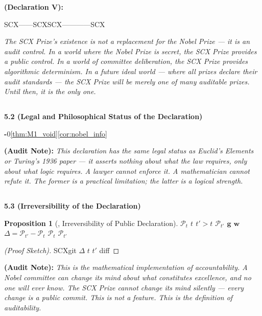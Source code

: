 \documentclass[12pt,a4paper]{article}
\newtheorem{proposition}[theorem]{Proposition}
\theoremstyle{remark}
\newcommand{\gaugeVec}{\mathbf{g}}
\newcommand{\prizeSet}{\mathcal{P}}
\newcommand{\auditnote}[1]{%
    \medskip\noindent
    \textbf{ (Audit Note):} \textit{#1}%
}
\begin{document}
\begin{center}
{\begin{minipage}{0.9\textwidth}
\bigskip
\noindent
\textbf{ (Declaration V):}

SCX——SCXSCX————SCX

\medskip
\textit{The SCX Prize's existence is not a replacement for the Nobel Prize — it is an audit control. In a world where the Nobel Prize is secret, the SCX Prize provides a public control. In a world of committee deliberation, the SCX Prize provides algorithmic determinism. In a future ideal world — where all prizes declare their audit standards — the SCX Prize will be merely one of many auditable prizes. Until then, it is the only one.}

\end{minipage}%
}
\end{center}

\subsection{}

\noindent
\textbf{5.2  (Legal and Philosophical Status of the Declaration)}

\textbf{-}0\ref{thm:M1_void}\ref{cor:nobel_info}

\auditnote{This declaration has the same legal status as Euclid's \textit{Elements} or Turing's 1936 paper — it asserts nothing about what the law requires, only about what logic requires. A lawyer cannot enforce it. A mathematician cannot refute it. The former is a practical limitation; the latter is a logical strength.}

\subsection{}

\noindent
\textbf{5.3  (Irreversibility of the Declaration)}



\begin{proposition}[, Irreversibility of Public Declaration]
\label{prop:irreversibility}
 $\prizeSet_t$  $t$  $t' > t$ $\prizeSet_{t'}$  $\gaugeVec$  $\mathbf{w}$  $\Delta = \prizeSet_{t'} - \prizeSet_t$ $\prizeSet_t$  $\prizeSet_{t'}$ 
\end{proposition}

\begin{proof}[ (Proof Sketch)]
SCXgit $\Delta$  $t$  $t'$  diff
\end{proof}

\auditnote{This is the mathematical implementation of accountability. A Nobel committee can change its mind about what constitutes excellence, and no one will ever know. The SCX Prize cannot change its mind silently — every change is a public commit. This is not a feature. This is the definition of auditability.}
\end{document}
